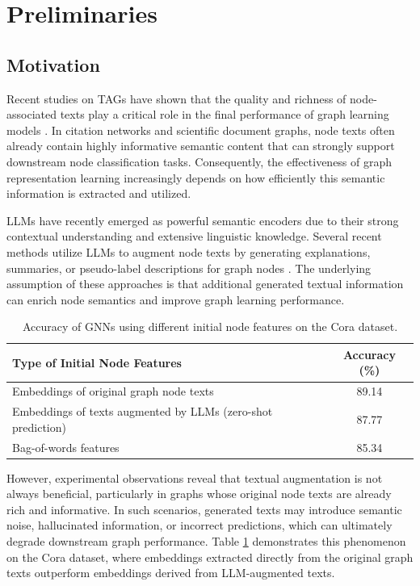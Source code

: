 \documentclass[a4paper,fleqn]{cas-sc}
\begin{document}
\section{Preliminaries}\label{sec:Preliminaries}
\subsection{Motivation}

Recent studies on TAGs have shown that the quality and richness of node-associated texts play a critical role in the final performance of graph learning models \citep{he2024harnessing}. In citation networks and scientific document graphs, node texts often already contain highly informative semantic content that can strongly support downstream node classification tasks. Consequently, the effectiveness of graph representation learning increasingly depends on how efficiently this semantic information is extracted and utilized.

LLMs have recently emerged as powerful semantic encoders due to their strong contextual understanding and extensive linguistic knowledge. Several recent methods utilize LLMs to augment node texts by generating explanations, summaries, or pseudo-label descriptions for graph nodes \citep{he2024harnessing}. The underlying assumption of these approaches is that additional generated textual information can enrich node semantics and improve graph learning performance.



\begin{table}[h]
\caption{Accuracy of GNNs using different initial node features on the Cora dataset.}
\label{tab:gnn_features_comparison}

\begin{tabular*}{\linewidth}{@{\extracolsep{\fill}} lc @{}}
\toprule
\textbf{Type of Initial Node Features} & \textbf{Accuracy (\%)} \\
\midrule
Embeddings of original graph node texts & 89.14 \\
Embeddings of texts augmented by LLMs (zero-shot prediction) & 87.77 \\
Bag-of-words features & 85.34 \\
\bottomrule
\end{tabular*}
\end{table}

However, experimental observations reveal that textual augmentation is not always beneficial, particularly in graphs whose original node texts are already rich and informative. In such scenarios, generated texts may introduce semantic noise, hallucinated information, or incorrect predictions, which can ultimately degrade downstream graph performance. Table \ref{tab:gnn_features_comparison} demonstrates this phenomenon on the Cora dataset, where embeddings extracted directly from the original graph texts outperform embeddings derived from LLM-augmented texts.
\end{document}
